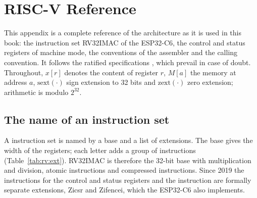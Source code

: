 \chapter{RISC-V Reference}
\label{app:riscv}

This appendix is a complete reference of the \riscv architecture as it is used
in this book: the instruction set RV32IMAC of the ESP32-C6, the control and
status registers of machine mode, the conventions of the assembler and the
calling convention. It follows the ratified specifications
\citep{riscvisa,riscvpriv,riscvabi,riscvasm}, which prevail in case of doubt.
Throughout, $x[r]$ denotes the content of register $r$, $M[a]$ the memory at
address $a$, $\mathrm{sext}(\cdot)$ sign extension to 32 bits and
$\mathrm{zext}(\cdot)$ zero extension; arithmetic is modulo $2^{32}$.

\section{The name of an instruction set}

A \riscv instruction set is named by a base and a list of extensions. The
base gives the width of the registers; each letter adds a group of
instructions (Table~\ref{tab:rv:ext}). RV32IMAC is therefore the 32-bit base
with multiplication and division, atomic instructions and compressed
instructions. Since 2019 the instructions for the control and status
registers and the instruction  are formally separate extensions,
Zicsr and Zifencei, which the ESP32-C6 also implements.

